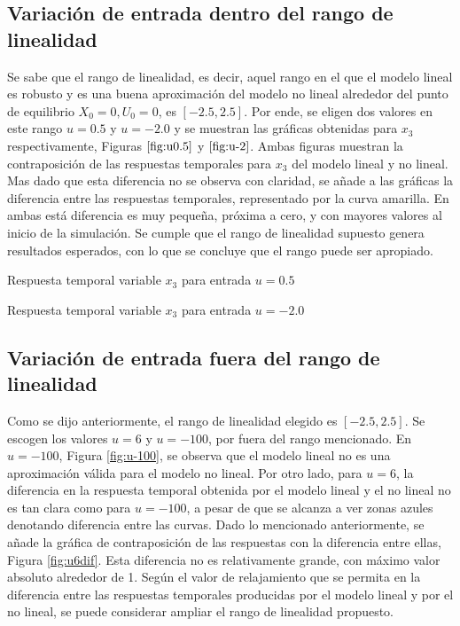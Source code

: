 \documentclass{ieeeaccess}
\begin{document}
\subsection{Variación de entrada dentro del rango de linealidad}
Se sabe que el rango de linealidad, es decir, aquel rango en el que el modelo lineal es robusto y es una buena aproximación del modelo no lineal alrededor del punto de equilibrio $X_0=0, U_0=0$, es $[-2.5,2.5]$. Por ende, se eligen dos valores en este rango $u = 0.5$ y $u = -2.0$ y se muestran las gráficas obtenidas para $x_3$ respectivamente, Figuras  $\ref{fig:u0.5}$ y $\ref{fig:u-2}$. Ambas figuras muestran la contraposición de las respuestas temporales para $x_3$ del modelo lineal y no lineal. Mas dado que esta diferencia no se observa con claridad, se añade a las gráficas la diferencia entre las respuestas temporales, representado por la curva amarilla. En ambas está diferencia es muy pequeña, próxima a cero, y con mayores valores al inicio de la simulación. Se cumple que el rango de linealidad supuesto genera resultados esperados, con lo que se concluye que el rango puede ser apropiado.  

       {Respuesta temporal variable $x_3$ para entrada $u=0.5$\label{fig:u0.5}}

       {Respuesta temporal variable $x_3$ para entrada $u=-2.0$\label{fig:u-2}}
       
\subsection{Variación de entrada fuera del rango de linealidad}
Como se dijo anteriormente, el rango de linealidad elegido es $[-2.5,2.5]$. Se escogen los valores $u=6$ y $u=-100$, por fuera del rango mencionado. En $u=-100$, Figura \ref{fig:u-100}, se observa que el modelo lineal no es una aproximación válida para el modelo no lineal. Por otro lado, para $u=6$, la diferencia en la respuesta temporal obtenida por el modelo lineal y el no lineal no es tan clara como para $u=-100$, a pesar de que se alcanza a ver zonas azules denotando diferencia entre las curvas. Dado lo mencionado anteriormente, se añade la gráfica de contraposición de las respuestas con la diferencia entre ellas, Figura \ref{fig:u6dif}. Esta diferencia no es relativamente grande, con máximo valor absoluto alrededor de 1. Según el valor de relajamiento que se permita en la diferencia entre las respuestas temporales producidas por el modelo lineal y por el no lineal, se puede considerar ampliar el rango de linealidad propuesto.
\end{document}
